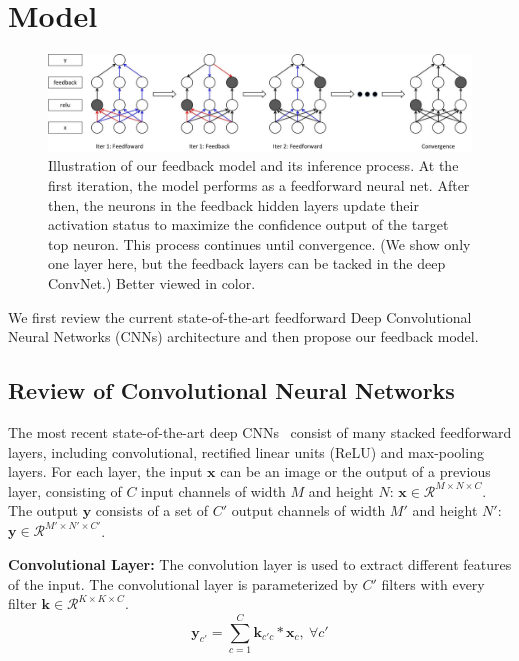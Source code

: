 \section{Model}
\label{sec:model}

\setlength{\tabcolsep}{2pt}
\begin{figure}
\begin{center}
\includegraphics[width=0.95\linewidth]{figs/model/model}
\caption{Illustration of our feedback model and its inference process. At the first iteration, the model performs as a feedforward neural net. After then, the neurons in the feedback hidden layers update their activation status to maximize the confidence output of the target top neuron. This process continues until convergence. (We show only one layer here, but the feedback layers can be tacked in the deep ConvNet.) Better viewed in color.}
\label{fig:model}
\end{center}
\end{figure}

We first review the current state-of-the-art feedforward Deep Convolutional Neural Networks (CNNs) architecture and then propose our feedback model.

\subsection{Review of Convolutional Neural Networks}
The most recent state-of-the-art deep CNNs~\cite{Simonyan2014Very} consist of many stacked feedforward layers, including convolutional, rectified linear units (ReLU) and max-pooling layers. For each layer, the input $\mathbf{x}$ can be an image or the output of a previous layer, consisting of $C$ input channels of width $M$ and height $N$: $\mathbf{x} \in \mathcal{R}^{M \times N \times C}$. The output $\mathbf{y}$ consists of a set of $C'$ output channels of width $M'$ and height $N'$: $\mathbf{y} \in \mathcal{R}^{M' \times N' \times C'}$.

\textbf{Convolutional Layer:}
The convolution layer is used to extract different features of the input. The convolutional layer is parameterized by $C'$ filters with every filter $\mathbf{k} \in \mathcal{R}^{K \times K \times C}$.
\begin{equation}
\mathbf{y}_{c'} = \sum_{c=1}^C \mathbf{k}_{c'c} * \mathbf{x}_c,\ \forall c'
\end{equation}

